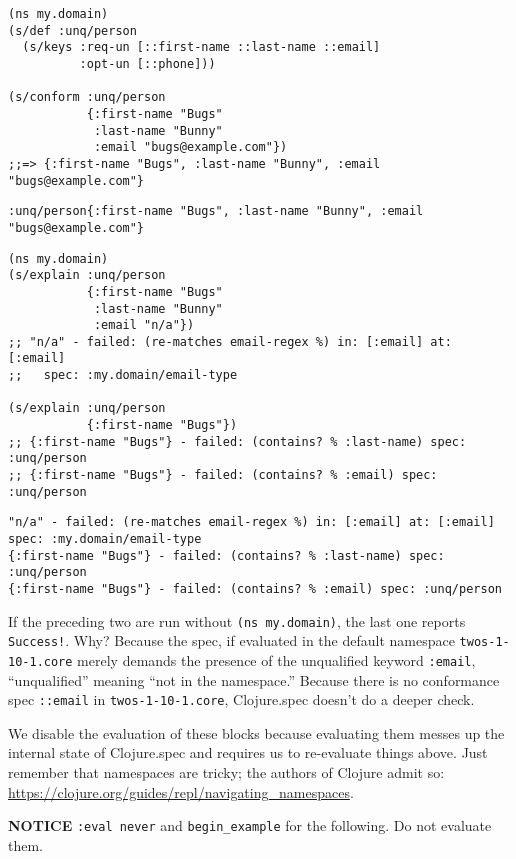 \documentclass[10pt,oneside,x11names]{article}
\begin{document}
\begin{verbatim}
(ns my.domain)
(s/def :unq/person
  (s/keys :req-un [::first-name ::last-name ::email]
          :opt-un [::phone]))

(s/conform :unq/person
           {:first-name "Bugs"
            :last-name "Bunny"
            :email "bugs@example.com"})
;;=> {:first-name "Bugs", :last-name "Bunny", :email "bugs@example.com"}
\end{verbatim}

\begin{verbatim}
:unq/person{:first-name "Bugs", :last-name "Bunny", :email "bugs@example.com"}
\end{verbatim}


\begin{verbatim}
(ns my.domain)
(s/explain :unq/person
           {:first-name "Bugs"
            :last-name "Bunny"
            :email "n/a"})
;; "n/a" - failed: (re-matches email-regex %) in: [:email] at: [:email]
;;   spec: :my.domain/email-type

(s/explain :unq/person
           {:first-name "Bugs"})
;; {:first-name "Bugs"} - failed: (contains? % :last-name) spec: :unq/person
;; {:first-name "Bugs"} - failed: (contains? % :email) spec: :unq/person
\end{verbatim}

\begin{verbatim}
"n/a" - failed: (re-matches email-regex %) in: [:email] at: [:email] spec: :my.domain/email-type
{:first-name "Bugs"} - failed: (contains? % :last-name) spec: :unq/person
{:first-name "Bugs"} - failed: (contains? % :email) spec: :unq/person
\end{verbatim}


If the preceding two are run without \texttt{(ns my.domain)}, the last one reports
\texttt{Success!}. Why? Because the spec, if evaluated in the default namespace
\texttt{twos-1-10-1.core} merely demands the presence of the unqualified keyword
\texttt{:email}, ``unqualified'' meaning ``not in the namespace.'' Because there is no
conformance spec \texttt{::email} in \texttt{twos-1-10-1.core}, Clojure.spec doesn't do a
deeper check.

We disable the evaluation of these blocks because evaluating them messes up the
internal state of Clojure.spec and requires us to re-evaluate things above. Just
remember that namespaces are tricky; the authors of Clojure admit so:
\url{https://clojure.org/guides/repl/navigating\_namespaces}.

\textbf{NOTICE} \texttt{:eval never} and \texttt{begin\_example} for the following. Do not evaluate them.
\end{document}
